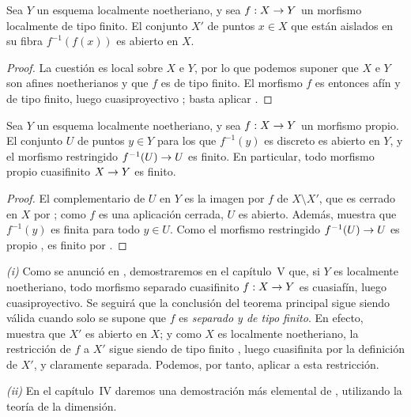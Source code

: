 \documentclass[oneside]{amsart}
\makeatletter
\newcommand{\ega@arrow}[2]{\mathchoice{#1}{#2}{#2}{#2}}
\renewcommand{\to}{\ega@arrow{\longrightarrow}{\rightarrow}}
\newcommand{\oldpage}[2][]{{\marginnote{\normalfont\textbf{#1}~|~#2}}\ignorespaces}
\let\EGAOriginalLabel\label
\renewcommand{\label}[1]{\phantomsection\EGAOriginalLabel{#1}}
\makeatother
\begin{document}
\begin{proposition}[4.4.10]
\label{III.4.4.10}
Sea $Y$ un esquema localmente noetheriano, y sea $f:X\to Y$ un
morfismo localmente de tipo finito. El conjunto $X'$ de puntos
$x\in X$ que están aislados en su fibra $f^{-1}(f(x))$ es abierto en
$X$.
\end{proposition}

\begin{proof}
La cuestión es local sobre $X$ e $Y$, por lo que podemos suponer que
$X$ e $Y$ son afines noetherianos y que $f$ es de tipo finito. El
morfismo $f$ es entonces afín y de tipo finito, luego
cuasiproyectivo ; basta aplicar
.
\end{proof}

\oldpage[III]{138}

\begin{corollary}[4.4.11]
\label{III.4.4.11}
Sea $Y$ un esquema localmente noetheriano, y sea $f:X\to Y$ un
morfismo propio. El conjunto $U$ de puntos $y\in Y$ para los que
$f^{-1}(y)$ es discreto es abierto en $Y$, y el morfismo restringido
$f^{-1}(U)\to U$ es finito. En particular, todo morfismo propio
cuasifinito $X\to Y$ es finito.
\end{corollary}

\begin{proof}
El complementario de $U$ en $Y$ es la imagen por $f$ de $X\setminus X'$, que
es cerrado en $X$ por ; como $f$ es una aplicación
cerrada, $U$ es abierto. Además,  muestra que
$f^{-1}(y)$ es finita para todo $y\in U$. Como el morfismo restringido
$f^{-1}(U)\to U$ es propio , es finito por
.
\end{proof}

\begin{remark}[4.4.12]
\label{III.4.4.12}
\emph{(i)}
Como se anunció en , demostraremos en el capítulo~V
que, si $Y$ es localmente noetheriano, todo morfismo separado
cuasifinito $f:X\to Y$ es cuasiafín, luego cuasiproyectivo. Se seguirá
que la conclusión del teorema principal  sigue siendo
válida cuando solo se supone que $f$ es \emph{separado y de tipo finito}.
En efecto,  muestra que $X'$ es abierto en $X$; y
como $X$ es localmente noetheriano, la restricción de $f$ a $X'$ sigue
siendo de tipo finito , luego cuasifinita por la
definición de $X'$, y claramente separada. Podemos, por tanto, aplicar
 a esta restricción.

\emph{(ii)}
En el capítulo~IV daremos una demostración más elemental de
, utilizando la teoría de la dimensión.
\end{remark}
\end{document}
